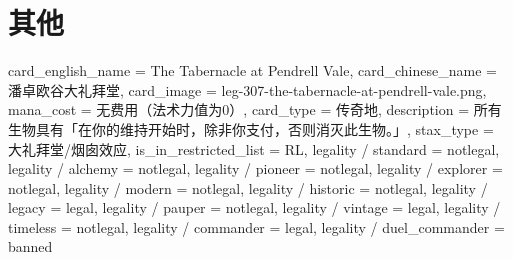 \documentclass[lang = cn, color = black, 10pt]{AllThatStax}
\begin{document}
\section{其他}

\card
{
	card_english_name = {The Tabernacle at Pendrell Vale},
	card_chinese_name = {潘卓欧谷大礼拜堂},
	card_image = leg-307-the-tabernacle-at-pendrell-vale.png,
	mana_cost = 无费用（法术力值为0）,
	card_type = 传奇地,
	description = {所有生物具有「在你的维持开始时，除非你支付，否则消灭此生物。」},
	stax_type = 大礼拜堂/烟囱效应,
	is_in_restricted_list = RL,
	legality / standard = notlegal,
	legality / alchemy = notlegal,
	legality / pioneer = notlegal,
	legality / explorer = notlegal,
	legality / modern = notlegal,
	legality / historic = notlegal,
	legality / legacy = legal,
	legality / pauper = notlegal,
	legality / vintage = legal,
	legality / timeless = notlegal,
	legality / commander = legal,
	legality / duel_commander = banned
}


\end{document}
